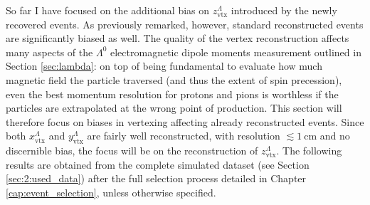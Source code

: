 So far I have focused on the additional bias on $z_\text{vtx}^\Lambda$ introduced by the newly recovered events.
As previously remarked, however, standard reconstructed events are significantly biased as well.
The quality of the \lambdadecay vertex reconstruction affects many aspects of the $\Lambda^0$ electromagnetic dipole moments measurement outlined in Section \ref{sec:lambda}:
on top of being fundamental to evaluate how much magnetic field the particle traversed (and thus the extent of spin precession), even the best momentum resolution for protons and pions is worthless if the particles are extrapolated at the wrong point of production.
This section will therefore focus on biases in \lambdadecay vertexing affecting already reconstructed events.
Since both $x_\text{vtx}^\Lambda$ and $y_\text{vtx}^\Lambda$ are fairly well reconstructed, with resolution $\lesssim \SI{1}{\centi\meter}$ and no discernible bias, the focus will be on the reconstruction of $z_\text{vtx}^\Lambda$.
The following results are obtained from the complete simulated \demonstratorshort dataset (see Section \ref{sec:2:used_data}) after the full selection process detailed in Chapter \ref{cap:event_selection}, unless otherwise specified.

